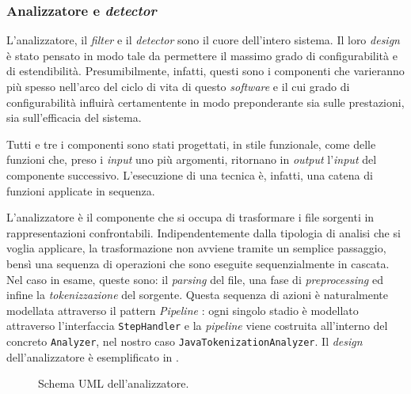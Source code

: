 \subsubsection*{Analizzatore e \textit{detector}}
L'analizzatore, il \textit{filter} e il \textit{detector} sono il cuore dell'intero sistema.
%
Il loro \textit{design} è stato pensato in modo tale da permettere il massimo grado di configurabilità e di estendibilità.
%
Presumibilmente, infatti, questi sono i componenti che varieranno più spesso nell'arco del ciclo di vita di questo \textit{software} e il cui grado di configurabilità influirà certamentente in modo preponderante sia sulle prestazioni, sia sull'efficacia del sistema.

Tutti e tre i componenti sono stati progettati, in stile funzionale, come delle funzioni che, preso i \textit{input} uno più argomenti, ritornano in \textit{output} l'\textit{input} del componente successivo.
%
L'esecuzione di una tecnica è, infatti, una catena di funzioni applicate in sequenza.

L'analizzatore è il componente che si occupa di trasformare i file sorgenti in rappresentazioni confrontabili.
%
Indipendentemente dalla tipologia di analisi che si voglia applicare, la trasformazione non avviene tramite un semplice passaggio, bensì una sequenza di operazioni che sono eseguite sequenzialmente in cascata.
%
Nel caso in esame, queste sono: il \textit{parsing} del file, una fase di \textit{preprocessing} ed infine la \textit{tokenizzazione} del sorgente.
%
Questa sequenza di azioni è naturalmente modellata attraverso il pattern \textit{Pipeline} \cite{pipeline-pattern}: ogni singolo stadio è modellato attraverso l'interfaccia \texttt{StepHandler} e la \textit{pipeline} viene costruita all'interno del concreto \texttt{Analyzer}, nel nostro caso \texttt{JavaTokenizationAnalyzer}.
%
Il \textit{design} dell'analizzatore è esemplificato in .

\begin{figure}[h!]
    \caption{Schema UML dell'analizzatore.}
    \label{img:02-analyzer}
\end{figure}


